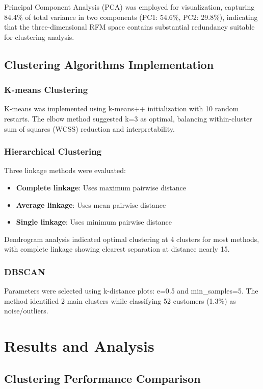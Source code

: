\documentclass[conference]{IEEEtran}
\begin{document}
Principal Component Analysis (PCA) was employed for visualization, capturing 84.4\% of total variance in two components (PC1: 54.6\%, PC2: 29.8\%), indicating that the three-dimensional RFM space contains substantial redundancy suitable for clustering analysis.

\subsection{Clustering Algorithms Implementation}

\subsubsection{K-means Clustering}
K-means was implemented using k-means++ initialization with 10 random restarts. The elbow method suggested k=3 as optimal, balancing within-cluster sum of squares (WCSS) reduction and interpretability.

\subsubsection{Hierarchical Clustering}
Three linkage methods were evaluated:
\begin{itemize}
\item \textbf{Complete linkage}: Uses maximum pairwise distance
\item \textbf{Average linkage}: Uses mean pairwise distance  
\item \textbf{Single linkage}: Uses minimum pairwise distance
\end{itemize}

Dendrogram analysis indicated optimal clustering at 4 clusters for most methods, with complete linkage showing clearest separation at distance nearly 15.

\subsubsection{DBSCAN}
Parameters were selected using k-distance plots: e=0.5 and min\_samples=5. The method identified 2 main clusters while classifying 52 customers (1.3\%) as noise/outliers.

\section{Results and Analysis}

\subsection{Clustering Performance Comparison}
\end{document}
